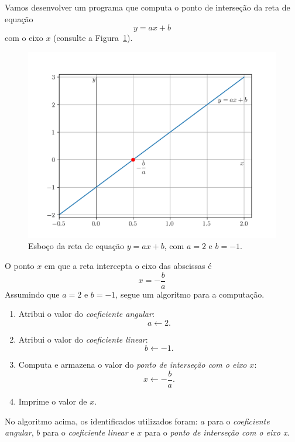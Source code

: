 \begin{ex}\label{cap_lingua_sec_dados:ex:reta}
  Vamos desenvolver um programa que computa o ponto de interseção da reta de equação
  \begin{equation}
    y = ax + b
  \end{equation}
  com o eixo $x$ (consulte a Figura~\ref{cap_lingua_sec_dados:fig:ex_reta}).

  \begin{figure}[H]
    \centering
    \includegraphics[width=\textwidth]{./cap_lingua/dados/fig_ex_reta/fig}
    \caption{Esboço da reta de equação $y = ax + b$, com $a=2$ e $b=-1$.}
    \label{cap_lingua_sec_dados:fig:ex_reta}
  \end{figure}

  O ponto $x$ em que a reta intercepta o eixo das abscissas é
  \begin{equation}
    x = -\frac{b}{a}
  \end{equation}
  Assumindo que $a=2$ e $b=-1$, segue um algoritmo para a computação.
  \begin{enumerate}
  \item Atribui o valor do \emph{coeficiente angular}:
    \begin{equation}
      a\leftarrow 2.
    \end{equation}
  \item Atribui o valor do \emph{coeficiente linear}:
    \begin{equation}
      b\leftarrow -1.
    \end{equation}
  \item Computa e armazena o valor do \emph{ponto de interseção com o eixo $x$}:
    \begin{equation}
      x \leftarrow -\frac{b}{a}.
    \end{equation}
  \item Imprime o valor de $x$.
  \end{enumerate}

  No algoritmo acima, os identificados utilizados foram: $a$ para o \emph{coeficiente angular}, $b$ para o \emph{coeficiente linear} e $x$ para o \emph{ponto de interseção com o eixo x}.
\end{ex}


